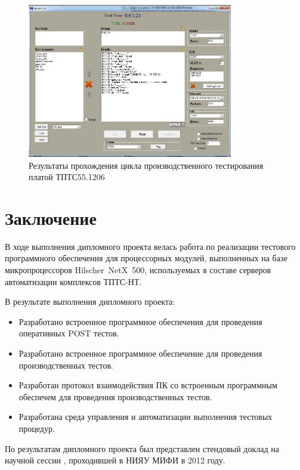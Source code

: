 \documentclass[a4paper,14pt,bachelor]{disser}
\begin{document}
\begin{figure}[H]
\addtocounter{myfigs}{1}
\begin{center}
	\includegraphics[width=0.8\textwidth]{1206-ok}
	\caption{\label{1206-ok} Результаты прохождения цикла производственного тестирования платой ТПТС55.1206}
\end{center}
\end{figure}


\chapter{Заключение}
В ходе выполнения дипломного проекта велась работа по реализации тестового программного обеспечения для процессорных модулей, выполненных на базе микропроцессоров Hilscher~NetX~500, используемых в составе серверов автоматизации комплексов ТПТС-НТ.

В результате выполнения дипломного проекта:
\begin{itemize}
 \item Разработано встроенное программное обеспечения для проведения оперативных POST тестов.
 \item Разработано встроенное программное обеспечение для проведения производственных тестов.
 \item Разработан протокол взаимодействия ПК со встроенным программным обеспечем для проведения производственных тестов.
 \item Разработана среда управления и автоматизации выполнения тестовых процедур.
\end{itemize}

По результатам дипломного проекта был представлен стендовый доклад на научной сессии \cite{stendMephi}, проходившей в НИЯУ МИФИ в 2012 году.
\end{document}
